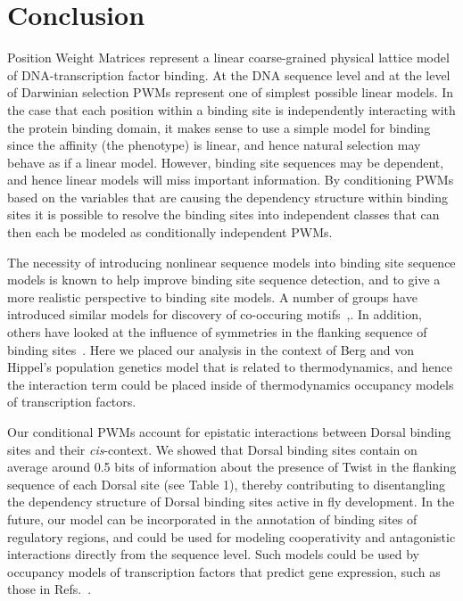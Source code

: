 \section{Conclusion}

Position Weight Matrices represent a linear coarse-grained physical lattice model of DNA-transcription factor binding.  At the DNA sequence level and at the level of Darwinian selection PWMs represent one of simplest possible linear models.  In the case that each position within a binding site is independently interacting with the protein binding domain, it makes sense to use a simple model for binding since the affinity (the phenotype) is linear, and hence natural selection may behave as if a linear model.  However, binding site sequences may be dependent, and hence linear models will miss important information.  By conditioning PWMs based on the variables that are causing the dependency structure within binding sites it is possible to resolve the binding sites into independent classes that can then each be modeled as conditionally independent PWMs.

The necessity of introducing nonlinear sequence models into binding site sequence models is known to help improve binding site sequence detection, and to give a more realistic perspective to binding site models.  A number of groups have introduced similar models for discovery of co-occuring motifs~\cite{liu2001bioprospector,pmid21486752,pmid16873468,pmid14762058},\cite{barasch,pmid18426806,pmid19286833,GuhaThakurta01072001,gadempmid19193149,Moses04phylogeneticmotif}.  In addition, others have looked at the influence of symmetries in the flanking sequence of binding sites~\cite{pmid21723826,pmid25313048}.  Here we placed our analysis in the context of Berg and von Hippel's population genetics model that is related to thermodynamics, and hence the interaction term could be placed inside of thermodynamics occupancy models of transcription factors.

Our conditional PWMs account for epistatic interactions between Dorsal binding sites and their \textit{cis}-context.  We showed that Dorsal binding sites contain on average around 0.5 bits of information about the presence of Twist in the flanking sequence of each Dorsal site (see Table 1), thereby contributing to disentangling the dependency structure of Dorsal binding sites active in fly development.  In the future, our model can be incorporated in the annotation of binding sites of regulatory regions, and could be used for modeling cooperativity and antagonistic interactions directly from the sequence level. Such models could be used by occupancy models of transcription factors that predict gene expression, such as those in Refs.~\cite{pmid20862354,pmid20087339}. 

